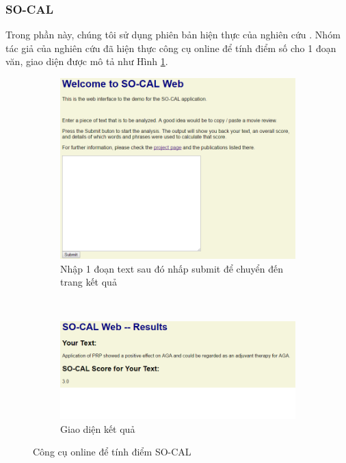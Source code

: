 \subsubsection*{SO-CAL}
Trong phần này, chúng tôi sử dụng phiên bản hiện thực của nghiên cứu \cite{taboada2011lexicon}. Nhóm tác giả của nghiên cứu \cite{taboada2011lexicon} đã hiện thực công cụ online để tính điểm số cho 1 đoạn văn, giao diện được mô tả như Hình \ref{fig:socal}.
\begin{figure}[h]
\centering
\begin{subfigure}[t]{0.45\textwidth}
\includegraphics[scale=0.3]{../hinh/socal.png}
\caption{Nhập 1 đoạn text sau đó nhấp submit để chuyển đến trang kết quả}
\end{subfigure}
~
\begin{subfigure}[t]{0.45\textwidth}
\includegraphics[scale=0.35]{../hinh/socal_result.png}
 \caption{Giao diện kết quả}
\end{subfigure}
\caption{Công cụ online để tính điểm SO-CAL} \label{fig:socal}
\end{figure}

